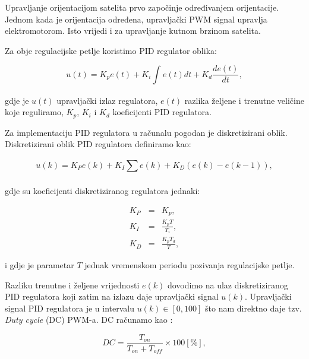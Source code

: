 \documentclass[times, utf8, diplomski, numeric]{templates/template}
\begin{document}
{{{{                Upravljanje orijentacijom satelita prvo započinje određivanjem orijentacije. Jednom kada je orijentacija određena, upravljački PWM signal upravlja elektromotorom. Isto vrijedi i za upravljanje kutnom brzinom satelita. 

                Za obje regulacijske petlje koristimo PID regulator oblika:

                \begin{equation}
                    u(t) = K_p e(t) + K_i \int_{}^{}{e(t)dt} + K_d \frac{de(t)}{dt},
                \end{equation}

                gdje je $u(t)$ upravljački izlaz regulatora, $e(t)$ razlika željene i trenutne veličine koje reguliramo, $K_p$, $K_i$ i $K_d$ koeficijenti PID regulatora.

                Za implementaciju PID regulatora u računalu pogodan je diskretizirani oblik. Diskretizirani oblik PID regulatora \cite{diskr_pid} definiramo kao:

                \begin{equation}
                    u(k) = K_P e(k) + K_I \sum_{}^{}{e(k)} + K_D (e(k) - e(k-1)),
                \end{equation}

                gdje su koeficijenti diskretiziranog regulatora jednaki:

                \begin{equation}
                    \begin{array}{rcl}
                        K_P & = & K_p,\\
                        K_I & = & \frac{K_p T}{T_i}, \\
                        K_D & = & \frac{K_p T_d}{T},
                    \end{array}
                \end{equation}

                i gdje je parametar $T$ jednak vremenskom periodu pozivanja regulacijske petlje.

                Razliku trenutne i željene vrijednosti $e(k)$ dovodimo na ulaz diskretiziranog PID regulatora koji zatim na izlazu daje upravljački signal $u(k)$. Upravljački signal PID regulatora je u intervalu $u(k) \in \left[ 0, 100 \right]$ što nam direktno daje tzv. \emph{Duty cycle} (DC) PWM-a. DC računamo kao \cite{dc_pwm}:

                \begin{equation}
                    DC = \frac{T_{on}}{T_{on} + T_{off}} \times 100 \left[ \% \right],
                \end{equation}

}}}}
\end{document}
